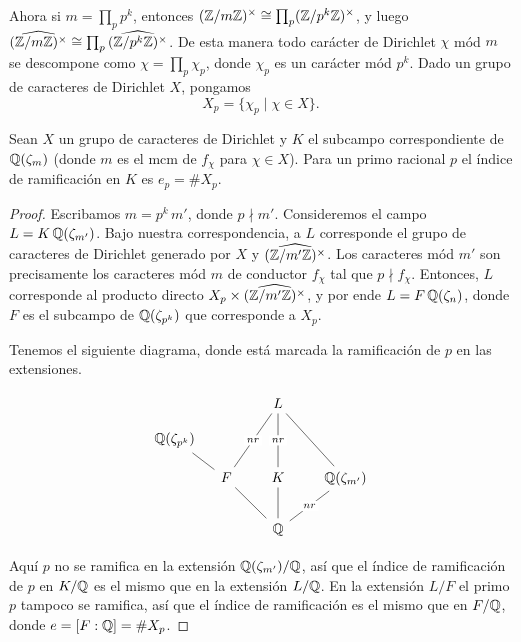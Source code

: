 Ahora si $m = \prod_p p^k$, entonces
$(\mathbb{Z}/m\mathbb{Z})^\times \cong \prod_p (\mathbb{Z}/p^k\mathbb{Z})^\times$, y luego
$\widehat{(\mathbb{Z}/m\mathbb{Z})^\times} \cong \prod_p \widehat{(\mathbb{Z}/p^k\mathbb{Z})^\times}$.
De esta manera todo carácter de Dirichlet $\chi$ mód $m$ se descompone como
$\chi = \prod_p \chi_p$, donde $\chi_p$ es un carácter mód $p^k$. Dado un grupo
de caracteres de Dirichlet $X$, pongamos
$$X_p = \{ \chi_p \mid \chi \in X \}.$$

\begin{teorema}
  Sean $X$ un grupo de caracteres de Dirichlet y $K$ el subcampo correspondiente
  de $\mathbb{Q} (\zeta_m)$ (donde $m$ es el mcm de $f_\chi$ para $\chi \in X$).
  Para un primo racional $p$ el índice de ramificación en $K$ es $e_p = \# X_p$.

  \begin{proof}
    Escribamos $m = p^k\,m'$, donde $p \nmid m'$. Consideremos el campo
    $L = K\,\mathbb{Q} (\zeta_{m'})$. Bajo nuestra correspondencia, a $L$ corresponde
    el grupo de caracteres de Dirichlet generado por $X$ y
    $\widehat{(\mathbb{Z}/m'\mathbb{Z})^\times}$. Los caracteres mód $m'$ son precisamente los
    caracteres mód $m$ de conductor $f_\chi$ tal que $p \nmid f_\chi$. Entonces,
    $L$ corresponde al producto directo
    $X_p \times \widehat{(\mathbb{Z}/m'\mathbb{Z})^\times}$, y por ende $L = F\,\mathbb{Q} (\zeta_n)$,
    donde $F$ es el subcampo de $\mathbb{Q} (\zeta_{p^k})$ que corresponde a $X_p$.

    Tenemos el siguiente diagrama, donde está marcada la ramificación de $p$
    en las extensiones.

    \[ \begin{tikzcd}[row sep=1em, column sep=1em]
       & & & L\ar[-]{ddll}[description]{nr}\ar[-]{dd}[description]{nr}\ar[-]{ddrr} \\
      \QQ (\zeta_{p^k})\ar[-]{dr} \\
      & F\ar[-]{ddrr} & & K\ar[-]{dd} & & \QQ (\zeta_{m'})\ar[-]{ddll}[description]{nr} \\
      \\
       & & & \QQ
    \end{tikzcd} \]

    Aquí $p$ no se ramifica en la extensión $\mathbb{Q} (\zeta_{m'})/\mathbb{Q}$, así que el
    índice de ramificación de $p$ en $K/\mathbb{Q}$ es el mismo que en la extensión
    $L/\mathbb{Q}$. En la extensión $L/F$ el primo $p$ tampoco se ramifica, así que
    el índice de ramificación es el mismo que en $F/\mathbb{Q}$, donde
    $e = [F:\mathbb{Q}] = \# X_p$.
  \end{proof}
\end{teorema}

